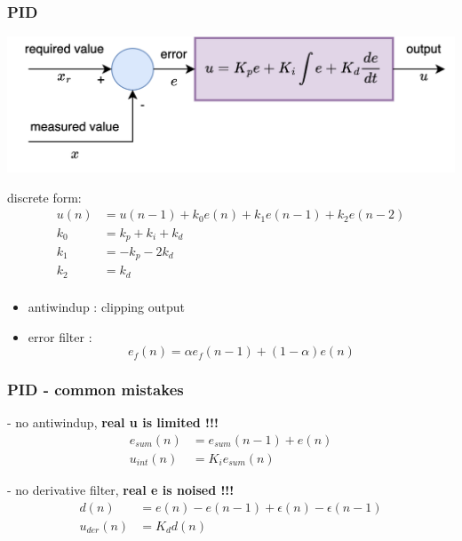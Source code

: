 \documentclass{beamer}
\begin{document}
\begin{frame}
  \frametitle{\bf PID}

  {\centering \includegraphics[scale=0.8]{../diagrams/controll/control-pid.png}}

  discrete form: 
  \begin{align*}
    u(n) &= u(n-1) + k_0e(n) + k_1e(n-1) + k_2e(n-2) \\
    k_0  &= k_p + k_i + k_d \\
    k_1  &=-k_p - 2k_d \\
    k_2  &= k_d \\
  \end{align*}
  
  \begin{itemize}
    \item antiwindup   : clipping output 
    \item error filter : $$e_f(n) = \alpha e_f(n-1) + (1 - \alpha)e(n)$$
  \end{itemize}

\end{frame}



\begin{frame}
  \frametitle{\bf PID - common mistakes}

  - no antiwindup, {\bf \color{red} real u is limited !!!}
  \begin{align*}
    e_{sum}(n) &= e_{sum}(n-1) + e(n) \\
    u_{int}(n)&= K_ie_{sum}(n)
  \end{align*}

  - no derivative filter, {\bf \color{red} real e is noised !!!}
  \begin{align*}
    d(n) &= e(n) - e(n-1) + \epsilon(n) - \epsilon(n-1) \\
    u_{der}(n)&= K_dd(n)
  \end{align*}
  
 
\end{frame}
\end{document}
